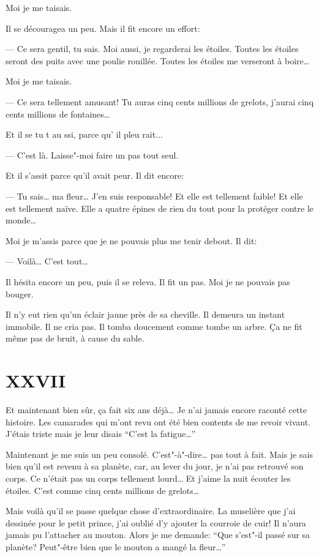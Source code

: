 Moi je me taisais.

Il se découragea un peu. Mais il fit encore un effort:

--- Ce sera gentil, tu sais. Moi aussi, je regarderai les étoiles. Toutes les
étoiles seront des puits avec une poulie rouillée. Toutes les étoiles me
verseront à boire\ldots{}

Moi je me taisais.

--- Ce sera tellement amusant! Tu auras cinq cents millions de grelots, j'aurai
cinq cents millions de fontaines\ldots{}

Et il se tu t au ssi, parce qu’ il pleu rait...

\medskip

--- C'est là. Laisse"-moi faire un pas tout seul.

Et il s'assit parce qu'il avait peur. Il dit encore:

--- Tu sais\ldots{} ma fleur\ldots{} J'en suis responsable! Et elle est tellement
faible! Et elle est tellement naïve. Elle a quatre épines de rien du tout pour
la protéger contre le monde\ldots{}

Moi je m'assis parce que je ne pouvais plus me tenir debout. Il dit:

--- Voilà\ldots{} C'est tout\ldots{}

Il hésita encore un peu, puis il se releva. Il fit un pas. Moi je ne pouvais pas
bouger.

Il n'y eut rien qu’un éclair jaune près de sa cheville. Il demeura un instant
immobile. Il ne cria pas. Il tomba doucement comme tombe un arbre. Ça ne fit même
pas de bruit, à cause du sable.

\section{XXVII}

Et maintenant bien sûr, ça fait six ans déjà\ldots{} Je n'ai jamais encore
raconté cette histoire. Les camarades qui m'ont revu ont été bien contents
de me revoir vivant. J'étais triste mais je leur disais ``C'est la fatigue\ldots{}''

Maintenant je me suis un peu consolé. C’est"-à"-dire\ldots{} pas tout à fait.
Mais je sais bien qu'il est revenu à sa planète, car, au lever du jour, je
n'ai pas retrouvé son corps. Ce n'était pas un corps tellement lourd\ldots{}
Et j'aime la nuit écouter les étoiles. C'est comme cinq cents millions de
grelots\ldots{}

Mais voilà qu'il se passe quelque chose d'extraordinaire. La muselière que 
j'ai dessinée pour le petit prince, j'ai oublié d'y ajouter la courroie de
cuir! Il n'aura jamais pu l'attacher au mouton. Alors je me demande: ``Que
s'est"-il passé sur sa planète? Peut"-être bien que le mouton a mangé la
fleur\ldots{}''

